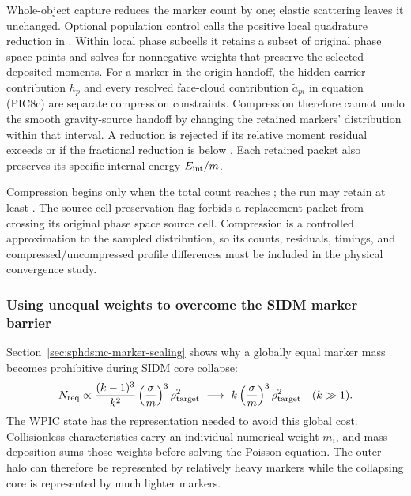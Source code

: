 Whole-object capture reduces the marker count by one; elastic scattering
leaves it unchanged.  Optional
population control calls the positive local quadrature reduction in
.  Within local phase subcells it
retains a subset of original phase space points and solves for nonnegative
weights that preserve the selected deposited moments.  For a marker in the
origin handoff, the hidden-carrier contribution \(h_p\) and every resolved
face-cloud contribution \(\widetilde a_{pi}\) in equation (PIC8c) are separate
compression constraints.  Compression therefore cannot undo the smooth
gravity-source handoff by changing the retained markers' distribution within
that interval.  A reduction is rejected
if its relative moment residual exceeds
 or if the fractional reduction is below
.  Each retained packet
also preserves its specific internal energy \(E_{\rm int}/m\).

Compression begins only when the total count reaches
; the run may retain at least
.  The source-cell preservation flag
forbids a replacement packet from crossing its original phase space source
cell.  Compression is a controlled approximation to the sampled distribution,
so its counts, residuals, timings, and compressed/uncompressed profile
differences must be included in the physical convergence study.

\subsubsection{Using unequal weights to overcome the SIDM marker barrier}
\label{sec:wpic-unequal-sidm-path}

Section~\ref{sec:sphdsmc-marker-scaling} shows why a globally equal marker
mass becomes prohibitive during SIDM core collapse:
\[
 N_{\rm req}\propto
 \frac{(k-1)^3}{k^2}
 \left(\frac{\sigma}{m}\right)^3\rho_{\rm target}^2
 \ \longrightarrow\
 k\left(\frac{\sigma}{m}\right)^3\rho_{\rm target}^2
 \quad(k\gg1).
\]
The WPIC state has the representation needed to avoid this global cost.
Collisionless characteristics carry an individual numerical weight \(m_i\),
and mass deposition sums those weights before solving the Poisson equation.
The outer halo can therefore be represented by relatively heavy markers while
the collapsing core is represented by much lighter markers.

